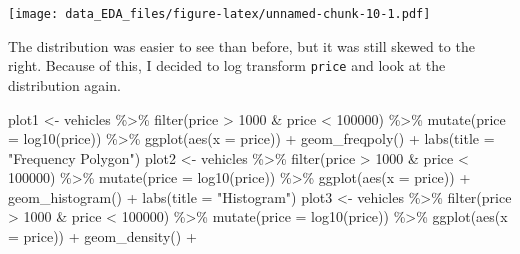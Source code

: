 \documentclass[
]{article}
\newenvironment{Shaded}{\begin{snugshade}}{\end{snugshade}}
\newcommand{\AttributeTok}[1]{\textcolor[rgb]{0.77,0.63,0.00}{#1}}
\newcommand{\DecValTok}[1]{\textcolor[rgb]{0.00,0.00,0.81}{#1}}
\newcommand{\FunctionTok}[1]{\textcolor[rgb]{0.00,0.00,0.00}{#1}}
\newcommand{\NormalTok}[1]{#1}
\newcommand{\OtherTok}[1]{\textcolor[rgb]{0.56,0.35,0.01}{#1}}
\newcommand{\SpecialCharTok}[1]{\textcolor[rgb]{0.00,0.00,0.00}{#1}}
\newcommand{\StringTok}[1]{\textcolor[rgb]{0.31,0.60,0.02}{#1}}
\begin{document}
\texttt{[image: data\_EDA\_files/figure-latex/unnamed-chunk-10-1.pdf]}

The distribution was easier to see than before, but it was still skewed
to the right. Because of this, I decided to log transform \texttt{price}
and look at the distribution again.

\begin{Shaded}
\begin{Highlighting}[]
\NormalTok{plot1 }\OtherTok{\textless{}{-}}\NormalTok{ vehicles }\SpecialCharTok{\%\textgreater{}\%} 
  \FunctionTok{filter}\NormalTok{(price }\SpecialCharTok{\textgreater{}} \DecValTok{1000} \SpecialCharTok{\&}\NormalTok{ price }\SpecialCharTok{\textless{}} \DecValTok{100000}\NormalTok{) }\SpecialCharTok{\%\textgreater{}\%} 
  \FunctionTok{mutate}\NormalTok{(}\AttributeTok{price =} \FunctionTok{log10}\NormalTok{(price)) }\SpecialCharTok{\%\textgreater{}\%} 
  \FunctionTok{ggplot}\NormalTok{(}\FunctionTok{aes}\NormalTok{(}\AttributeTok{x =}\NormalTok{ price)) }\SpecialCharTok{+} 
  \FunctionTok{geom\_freqpoly}\NormalTok{() }\SpecialCharTok{+} 
  \FunctionTok{labs}\NormalTok{(}\AttributeTok{title =} \StringTok{"Frequency Polygon"}\NormalTok{)}
\NormalTok{plot2 }\OtherTok{\textless{}{-}}\NormalTok{ vehicles }\SpecialCharTok{\%\textgreater{}\%} 
  \FunctionTok{filter}\NormalTok{(price }\SpecialCharTok{\textgreater{}} \DecValTok{1000} \SpecialCharTok{\&}\NormalTok{ price }\SpecialCharTok{\textless{}} \DecValTok{100000}\NormalTok{) }\SpecialCharTok{\%\textgreater{}\%} 
  \FunctionTok{mutate}\NormalTok{(}\AttributeTok{price =} \FunctionTok{log10}\NormalTok{(price)) }\SpecialCharTok{\%\textgreater{}\%} 
  \FunctionTok{ggplot}\NormalTok{(}\FunctionTok{aes}\NormalTok{(}\AttributeTok{x =}\NormalTok{ price)) }\SpecialCharTok{+} 
  \FunctionTok{geom\_histogram}\NormalTok{() }\SpecialCharTok{+} 
  \FunctionTok{labs}\NormalTok{(}\AttributeTok{title =} \StringTok{"Histogram"}\NormalTok{)}
\NormalTok{plot3 }\OtherTok{\textless{}{-}}\NormalTok{ vehicles }\SpecialCharTok{\%\textgreater{}\%} 
  \FunctionTok{filter}\NormalTok{(price }\SpecialCharTok{\textgreater{}} \DecValTok{1000} \SpecialCharTok{\&}\NormalTok{ price }\SpecialCharTok{\textless{}} \DecValTok{100000}\NormalTok{) }\SpecialCharTok{\%\textgreater{}\%} 
  \FunctionTok{mutate}\NormalTok{(}\AttributeTok{price =} \FunctionTok{log10}\NormalTok{(price)) }\SpecialCharTok{\%\textgreater{}\%} 
  \FunctionTok{ggplot}\NormalTok{(}\FunctionTok{aes}\NormalTok{(}\AttributeTok{x =}\NormalTok{ price)) }\SpecialCharTok{+} 
  \FunctionTok{geom\_density}\NormalTok{() }\SpecialCharTok{+} 

\end{Highlighting}
\end{Shaded}
\end{document}

